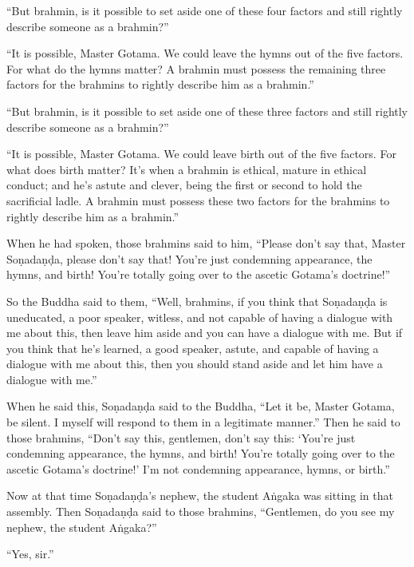 \documentclass[12pt,openany]{book}%
\begin{document}
“But brahmin, is it possible to set aside one of these four factors and still rightly describe someone as a brahmin?” 

“It is possible, Master Gotama. We could leave the hymns out of the five factors. For what do the hymns matter? A brahmin must possess the remaining three factors for the brahmins to rightly describe him as a brahmin.” 

“But brahmin, is it possible to set aside one of these three factors and still rightly describe someone as a brahmin?” 

“It is possible, Master Gotama. We could leave birth out of the five factors. For what does birth matter? It’s when a brahmin is ethical, mature in ethical conduct; and he’s astute and clever, being the first or second to hold the sacrificial ladle. A brahmin must possess these two factors for the brahmins to rightly describe him as a brahmin.” 

When he had spoken, those brahmins said to him, “Please don’t say that, Master \textsanskrit{Soṇadaṇḍa}, please don’t say that! You’re just condemning appearance, the hymns, and birth! You’re totally going over to the ascetic Gotama’s doctrine!” 

So the Buddha said to them, “Well, brahmins, if you think that \textsanskrit{Soṇadaṇḍa} is uneducated, a poor speaker, witless, and not capable of having a dialogue with me about this, then leave him aside and you can have a dialogue with me. But if you think that he’s learned, a good speaker, astute, and capable of having a dialogue with me about this, then you should stand aside and let him have a dialogue with me.” 

When he said this, \textsanskrit{Soṇadaṇḍa} said to the Buddha, “Let it be, Master Gotama, be silent. I myself will respond to them in a legitimate manner.” Then he said to those brahmins, “Don’t say this, gentlemen, don’t say this: ‘You’re just condemning appearance, the hymns, and birth! You’re totally going over to the ascetic Gotama’s doctrine!’ I’m not condemning appearance, hymns, or birth.” 

Now at that time \textsanskrit{Soṇadaṇḍa}’s nephew, the student \textsanskrit{Aṅgaka} was sitting in that assembly. Then \textsanskrit{Soṇadaṇḍa} said to those brahmins, “Gentlemen, do you see my nephew, the student \textsanskrit{Aṅgaka}?” 

“Yes, sir.” 
\end{document}

